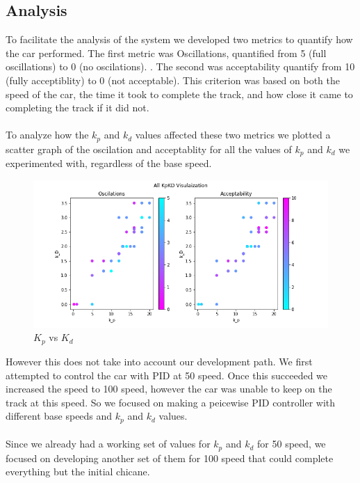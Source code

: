 \documentclass[12pt]{article}
\begin{document}
\begin{multicols}{2}
\section*{Analysis}
To facilitate the analysis of the system we developed two metrics to quantify how
the car performed. The first metric was Oscillations, quantified from 5 (full oscillations) to 0 (no oscilations).
. The second was acceptability quantify from 10 (fully acceptiblity) to 0 (not acceptable). This criterion was
based on both the speed of the car, the time it took to complete the track, and how close it came to 
completing the track if it did not. \\\\
To analyze how the $k_p$ and $k_d$ values affected these two metrics we plotted a scatter graph of the oscilation and acceptablity
for all the values of $k_p$ and $k_d$ we experimented with, regardless of the base speed.
\begin{center}
\begin{figure}[h!]
    \centering
    \includegraphics*[scale=0.3]{KpKiAll.png}
    \caption{$K_p$ vs $K_d$}
\end{figure}
\end{center}
However this does not take into account our development path. 
We first attempted to control the car with PID at 50 speed. Once this succeeded we increased the speed to 
100 speed, however the car was unable to keep on the track at this speed. So we focused on making a peicewise PID controller with different base speeds and 
$k_p$ and $k_d$ values.\\\\
 Since we already had a working set of values for $k_p$ and $k_d$ for 50 speed, we focused on developing another set of
them for 100 speed that could complete everything but the initial chicane. \\\\

\end{multicols}
\end{document}
